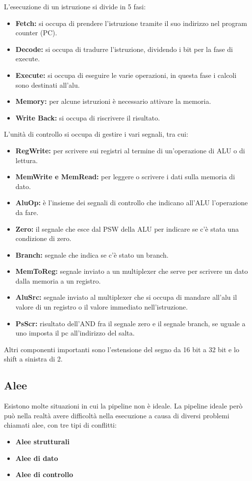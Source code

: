 \documentclass{article}
\begin{document}
L'esecuzione di un istruzione si divide in 5 fasi:
\begin{itemize}
    \item \textbf{Fetch:} si occupa di prendere l'istruzione tramite il suo indirizzo nel program counter (PC).
    \item \textbf{Decode:} si occupa di tradurre l'istruzione, dividendo i bit per la fase di execute.
    \item \textbf{Execute:} si occupa di eseguire le varie operazioni, in questa fase i calcoli sono destinati all'alu.
    \item \textbf{Memory:} per alcune istruzioni è necessario attivare la memoria.
    \item \textbf{Write Back:} si occupa di riscrivere il risultato.
\end{itemize}
L'unità di controllo si occupa di gestire i vari segnali, tra cui:
\begin{itemize}
    \item \textbf{RegWrite:} per scrivere sui registri al termine di un’operazione di ALU o di lettura.
    \item \textbf{MemWrite e MemRead:} per leggere o scrivere i dati sulla memoria di dato.
    \item \textbf{AluOp:} è l’insieme dei segnali di controllo che indicano all’ALU l’operazione da fare.
    \item \textbf{Zero:}  il segnale che esce dal PSW della ALU per indicare se c’è stata una condizione di zero.
    \item \textbf{Branch:} segnale che indica se c'è stato un branch.
    \item \textbf{MemToReg:} segnale inviato a un multiplexer che serve per scrivere un dato dalla memoria a un registro.
    \item \textbf{AluSrc:} segnale inviato al multiplexer che si occupa di mandare all'alu il valore di un registro o il valore immediato nell'istruzione.
    \item \textbf{PsScr:} risultato dell'AND fra il segnale zero e il segnale branch, se uguale a uno imposta il pc all'indirizzo del salta.
\end{itemize}
Altri componenti importanti sono l'estensione del segno da 16 bit a 32 bit e lo shift a sinistra di 2.

\subsection{Alee}
Esistono molte situazioni in cui la pipeline non è ideale. La pipeline ideale però può nella realtà avere difficoltà nella esecuzione a causa di diversi problemi chiamati alee, con tre tipi di conflitti:
\begin{itemize}
    \item \textbf{Alee strutturali}
    \item \textbf{Alee di dato}
    \item \textbf{Alee di controllo}
\end{itemize}
\end{document}
